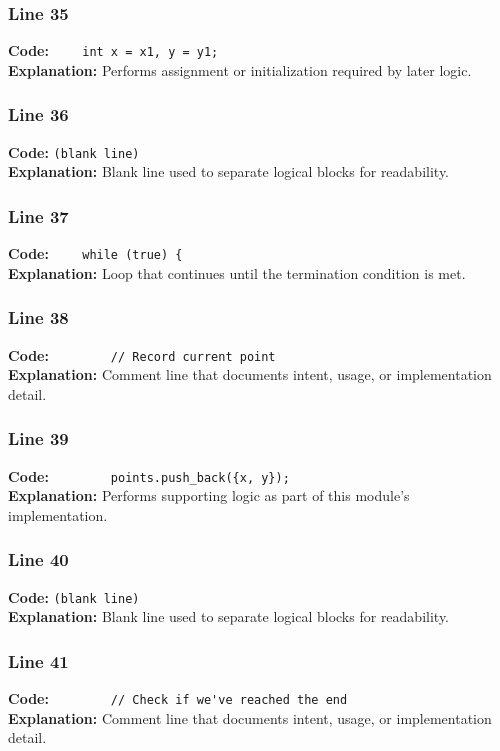 \documentclass[11pt,a4paper]{article}
\begin{document}
\subsubsection*{Line 35}
\textbf{Code:} \verb|    int x = x1, y = y1;|\\
\textbf{Explanation:} Performs assignment or initialization required by later logic.

\subsubsection*{Line 36}
\textbf{Code:} \texttt{(blank line)}\\
\textbf{Explanation:} Blank line used to separate logical blocks for readability.

\subsubsection*{Line 37}
\textbf{Code:} \verb|    while (true) {|\\
\textbf{Explanation:} Loop that continues until the termination condition is met.

\subsubsection*{Line 38}
\textbf{Code:} \verb|        // Record current point|\\
\textbf{Explanation:} Comment line that documents intent, usage, or implementation detail.

\subsubsection*{Line 39}
\textbf{Code:} \verb|        points.push_back({x, y});|\\
\textbf{Explanation:} Performs supporting logic as part of this module's implementation.

\subsubsection*{Line 40}
\textbf{Code:} \texttt{(blank line)}\\
\textbf{Explanation:} Blank line used to separate logical blocks for readability.

\subsubsection*{Line 41}
\textbf{Code:} \verb|        // Check if we've reached the end|\\
\textbf{Explanation:} Comment line that documents intent, usage, or implementation detail.
\end{document}
